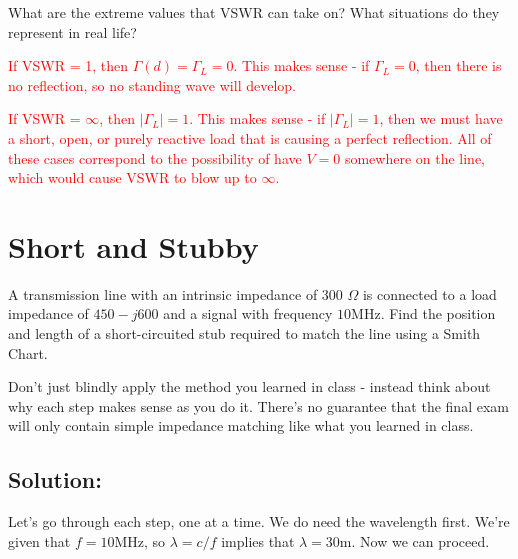 \documentclass{article}
\begin{document}
What are the extreme values that VSWR can take on? What situations do they represent in real life?

\textcolor{red}{If VSWR = 1, then $\Gamma(d) = \Gamma_L = 0$. This makes sense - if $\Gamma_L = 0$, then there is no reflection, so no standing wave will develop.}

\textcolor{red}{If VSWR = $\infty$, then $\vert \Gamma_L \vert = 1$. This makes sense - if $\vert \Gamma_L \vert = 1$, then we must have a short, open, or purely reactive load that is causing a perfect reflection. All of these cases correspond to the possibility of have $V = 0$ somewhere on the line, which would cause VSWR to blow up to $\infty$.}

\vfill
\newpage

\section{Short and Stubby}

A transmission line with an intrinsic impedance of 300 $\Omega$ is connected to a load impedance of $450-j600$ and a signal with frequency $10$MHz. Find the position and length of a short-circuited stub required to match the line using a Smith Chart.

Don't just blindly apply the method you learned in class - instead think about why each step makes sense as you do it. There's no guarantee that the final exam will only contain simple impedance matching like what you learned in class.

\subsection{Solution:}

Let's go through each step, one at a time. We do need the wavelength first. We're given that $f = 10$MHz, so $\lambda = c/f$ implies that $\lambda = 30$m. Now we can proceed.
\end{document}
